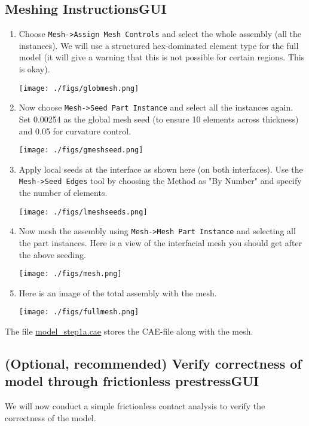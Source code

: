 \documentclass[11pt]{article}
\begin{document}
\subsection{Meshing Instructions\hfill{}\textsc{GUI}}
\label{sec:org151496a}
\begin{enumerate}
\item Choose \texttt{Mesh->Assign Mesh Controls} and select the whole assembly (all the instances).
We will use a structured hex-dominated element type for the full model (it will give a warning that this is not possible for certain regions. This is okay).
\begin{center}
\texttt{[image: ./figs/globmesh.png]}
\end{center}
\item Now choose \texttt{Mesh->Seed Part Instance} and select all the instances again.
Set 0.00254 as the global mesh seed (to ensure 10 elements across thickness) and 0.05 for curvature control.
\begin{center}
\texttt{[image: ./figs/gmeshseed.png]}
\end{center}
\item Apply local seeds at the interface as shown here (on both interfaces).
Use the \texttt{Mesh->Seed Edges} tool by choosing the Method as "By Number" and specify the number of elements.
\begin{center}
\texttt{[image: ./figs/lmeshseeds.png]}
\end{center}
\item Now mesh the assembly using \texttt{Mesh->Mesh Part Instance} and selecting all the part instances.
Here is a view of the interfacial mesh you should get after the above seeding.
\begin{center}
\texttt{[image: ./figs/mesh.png]}
\end{center}
\item Here is an image of the total assembly with the mesh.
\begin{center}
\texttt{[image: ./figs/fullmesh.png]}
\end{center}
\end{enumerate}

The file \href{https://github.com/Nidish96/Abaqus4Joints/blob/main/assets/assembly/model\_step1a.cae}{model\_step1a.cae} stores the CAE-file along with the mesh.
\subsection{(Optional, recommended) Verify correctness of model through frictionless prestress\hfill{}\textsc{GUI}}
\label{sec:abqprs}
We will now conduct a simple frictionless contact analysis to verify the correctness of the model.
\end{document}
